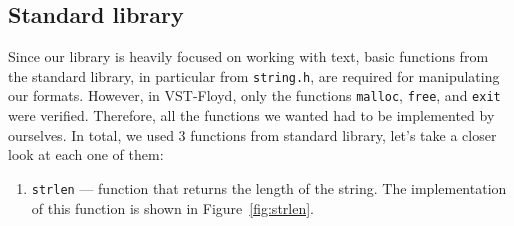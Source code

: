 \documentclass[14pt]{constructor-diploma}
\begin{document}
\subsection{Standard library}
Since our library is heavily focused on working with text, basic functions from the standard library, 
in particular from \texttt{string.h}, are required for manipulating our formats. However, 
in VST-Floyd, only the functions \texttt{malloc}, \texttt{free}, and \texttt{exit} were verified. 
Therefore, all the functions we wanted had to be implemented by ourselves. In total, we used 3 functions 
from standard library, let's take a closer look at each one of them:

\begin{enumerate}
  \item \texttt{strlen} --- function that returns the length of the string. 
    The implementation of this function is shown in Figure~\ref{fig:strlen}.
      \begin{figure}[H]


\end{figure}
\end{enumerate}
\end{document}
